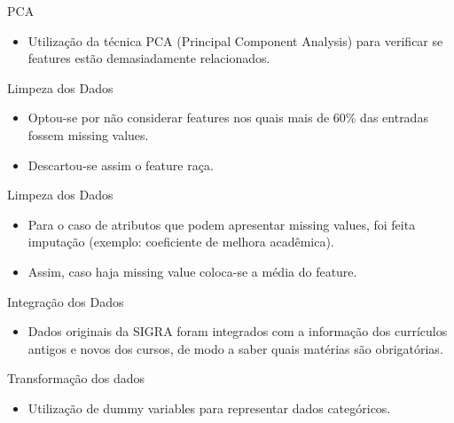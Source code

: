 \begin{frame}{PCA}
\begin{itemize}[itemsep=3ex]
    \item Utilização da técnica PCA (Principal Component Analysis) para verificar se
        features estão demasiadamente relacionados. 
\end{itemize}
\end{frame}

\begin{frame}{Limpeza dos Dados}
\begin{itemize}[itemsep=3ex]
    \item Optou-se por não considerar features nos quais mais de 60\% das entradas
        fossem missing values.
    \item Descartou-se assim o feature raça.
\end{itemize}
\end{frame}

\begin{frame}{Limpeza dos Dados}
\begin{itemize}[itemsep=3ex]
    \item Para o caso de atributos que podem apresentar missing values, foi feita
        imputação (exemplo: coeficiente de melhora acadêmica).
    \item Assim, caso haja missing value coloca-se a média do feature. 
\end{itemize}
\end{frame}

\begin{frame}{Integração dos Dados}
\begin{itemize}[itemsep=3ex]
    \item Dados originais da SIGRA foram integrados com a informação dos currículos
        antigos e novos dos cursos, de modo a saber quais matérias são obrigatórias. 
\end{itemize}
\end{frame}

\begin{frame}{Transformação dos dados}
\begin{itemize}[itemsep=3ex]
    \item Utilização de dummy variables para representar dados categóricos.  
\end{itemize}
\end{frame}

